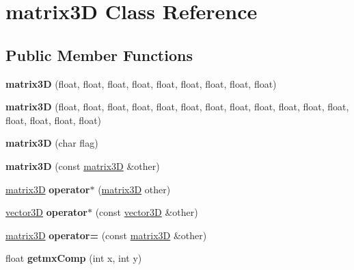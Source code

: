 \hypertarget{classmatrix3_d}{}\section{matrix3D Class Reference}
\label{classmatrix3_d}
\subsection*{Public Member Functions}
\begin{DoxyCompactItemize}
\item 
\mbox{\label{classmatrix3_d_ae782f97d9410dd17ce60ae36a381ecd1}} 
{\bfseries matrix3D} (float, float, float, float, float, float, float, float, float)
\item 
\mbox{\label{classmatrix3_d_a7d5bc2b85c4b3ecbcb9f05e1b8745a20}} 
{\bfseries matrix3D} (float, float, float, float, float, float, float, float, float, float, float, float, float, float, float, float)
\item 
\mbox{\label{classmatrix3_d_a891833e63734860f24cc0c9ad6448d3d}} 
{\bfseries matrix3D} (char flag)
\item 
\mbox{\label{classmatrix3_d_ac84c95f15ead4cd7e6f4ebc88586e823}} 
{\bfseries matrix3D} (const \hyperlink{classmatrix3_d}{matrix3D} \&other)
\item 
\mbox{\label{classmatrix3_d_addb011d619e41bf0d33f663e1598976b}} 
\hyperlink{classmatrix3_d}{matrix3D} {\bfseries operator$\ast$} (\hyperlink{classmatrix3_d}{matrix3D} other)
\item 
\mbox{\label{classmatrix3_d_a58a0bd5809f10aee3b2f63a7f14454a6}} 
\hyperlink{classvector3_d}{vector3D} {\bfseries operator$\ast$} (const \hyperlink{classvector3_d}{vector3D} \&other)
\item 
\mbox{\label{classmatrix3_d_ae56cd9ecf1a2513e334154fdb43be57b}} 
\hyperlink{classmatrix3_d}{matrix3D} {\bfseries operator=} (const \hyperlink{classmatrix3_d}{matrix3D} \&other)
\item 
\mbox{\label{classmatrix3_d_a10c7b075958e7c73a376e288049a6582}} 
float {\bfseries getmx\+Comp} (int x, int y)

\end{DoxyCompactItemize}
